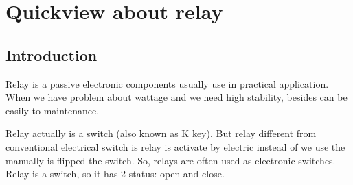 \documentclass[a4paper]{report}
\begin{document}
    \section{Quickview about relay}
        \subsection{Introduction}
            Relay is a passive electronic components usually use in practical application. When we 
            have problem about wattage and we need high stability, besides can be easily to maintenance.
            \linebreak
            \par Relay actually is a switch (also known as K key). But relay different from conventional electrical 
            switch is relay is activate by electric instead of we use the manually is flipped the switch. 
            So, relays are often used as electronic switches. Relay is a switch, so it has 2 status: open and close.
\end{document}
